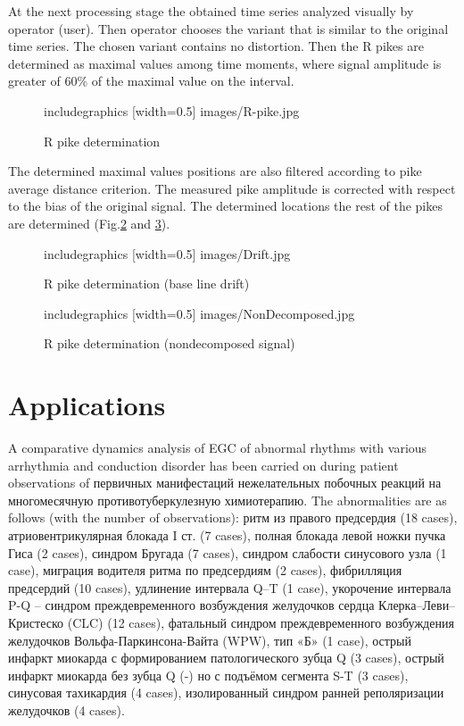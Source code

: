 \documentclass[runningheads]{AIIT}
\newcommand{\nnn}[2][rcolor]{\noindent%
\textcolor{eclr}{}\textcolor{#1}{#2}\textcolor{eclr}{}}
\begin{document}
At the next processing stage the obtained time series analyzed visually by operator (user).  Then operator chooses the variant that is similar to the original time series.  The chosen variant contains no distortion.  Then the R pikes are determined as maximal values among time moments, where signal amplitude is greater of 60\% of the maximal value on the interval.

\begin{figure}[htb]
  \centering
    includegraphics [width=0.5\linewidth] {images/R-pike.jpg}
  \caption{R pike determination}
  \label{fig:determ-R}
\end{figure}
The determined maximal values positions are also filtered according to pike average distance criterion.  The measured pike amplitude is corrected with respect to the bias of the original signal.  The determined locations the rest of the pikes are determined (Fig.\ref{fig:fig6} and \ref{fig:fig7}).

\begin{figure}[htb]
  \centering
    includegraphics [width=0.5\linewidth] {images/Drift.jpg}
  \caption{R pike determination (base line drift)}
  \label{fig:fig6}
\end{figure}

\begin{figure}[htb]
  \centering
    includegraphics [width=0.5\linewidth] {images/NonDecomposed.jpg}
  \caption{R pike determination (nondecomposed signal)}
  \label{fig:fig7}
\end{figure}

\section{Applications}
\label{sec:applications}

A comparative dynamics analysis of EGC of \nnn{abnormal} rhythms with various arrhythmia and conduction disorder has been carried on during patient observations of \nnn{первичных манифестаций нежелательных побочных реакций на многомесячную противотуберкулезную химиотерапию}.  The abnormalities are as follows (with the number of observations): ритм из правого предсердия (18 cases), атриовентрикулярная блокада I ст. (7 cases), полная блокада левой ножки пучка Гиса (2 cases), синдром Бругада (7 cases), синдром слабости синусового узла (1 case), миграция водителя ритма по предсердиям (2 cases), фибрилляция предсердий (10 cases), удлинение интервала Q–T (1 case), укорочение интервала P-Q – синдром  преждевременного возбуждения желудочков сердца Клерка–Леви–Кристеско (CLC) (12 cases), фатальный синдром  преждевременного возбуждения желудочков  Вольфа-Паркинсона-Вайта (WPW), тип «Б» (1 case), острый инфаркт миокарда с формированием патологического зубца Q (3 cases), острый инфаркт миокарда без зубца Q (-) но с подъёмом сегмента S-T (3 cases), синусовая тахикардия (4 cases), изолированный синдром ранней реполяризации желудочков (4 cases).
\end{document}

